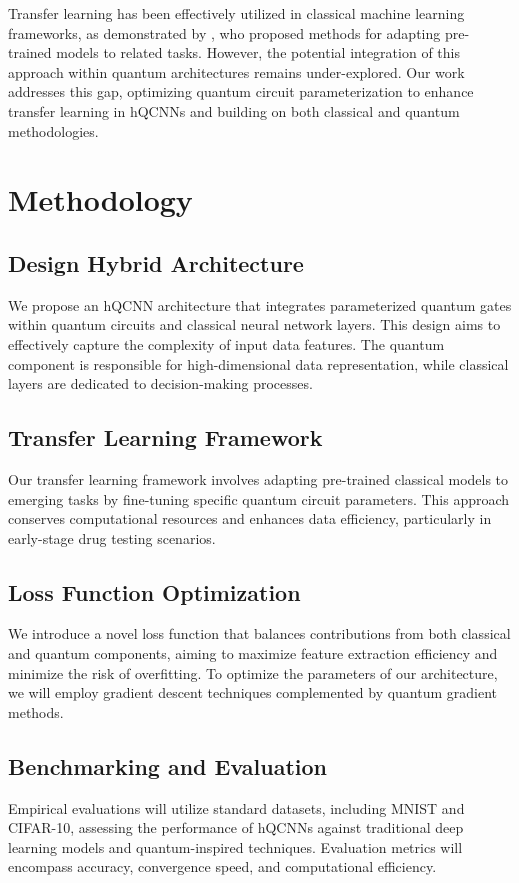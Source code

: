 \documentclass{article}
\begin{document}
Transfer learning has been effectively utilized in classical machine learning frameworks, as demonstrated by \cite{Pan2010}, who proposed methods for adapting pre-trained models to related tasks. However, the potential integration of this approach within quantum architectures remains under-explored. Our work addresses this gap, optimizing quantum circuit parameterization to enhance transfer learning in hQCNNs and building on both classical and quantum methodologies.

\section{Methodology}
\subsection{Design Hybrid Architecture}
We propose an hQCNN architecture that integrates parameterized quantum gates within quantum circuits and classical neural network layers. This design aims to effectively capture the complexity of input data features. The quantum component is responsible for high-dimensional data representation, while classical layers are dedicated to decision-making processes.

\subsection{Transfer Learning Framework}
Our transfer learning framework involves adapting pre-trained classical models to emerging tasks by fine-tuning specific quantum circuit parameters. This approach conserves computational resources and enhances data efficiency, particularly in early-stage drug testing scenarios.

\subsection{Loss Function Optimization}
We introduce a novel loss function that balances contributions from both classical and quantum components, aiming to maximize feature extraction efficiency and minimize the risk of overfitting. To optimize the parameters of our architecture, we will employ gradient descent techniques complemented by quantum gradient methods.

\subsection{Benchmarking and Evaluation}
Empirical evaluations will utilize standard datasets, including MNIST and CIFAR-10, assessing the performance of hQCNNs against traditional deep learning models and quantum-inspired techniques. Evaluation metrics will encompass accuracy, convergence speed, and computational efficiency.
\end{document}
